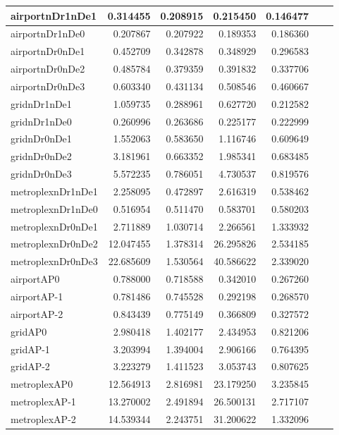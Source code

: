 \begin{longtable}{|l|r|r|r|r|r|r|}
\endlastfoot
airportnDr1nDe1 & 0.314455 & 0.208915 & 0.215450 & 0.146477 \\ \hline
airportnDr1nDe0 & 0.207867 & 0.207922 & 0.189353 & 0.186360 \\ \hline
airportnDr0nDe1 & 0.452709 & 0.342878 & 0.348929 & 0.296583 \\ \hline
airportnDr0nDe2 & 0.485784 & 0.379359 & 0.391832 & 0.337706 \\ \hline
airportnDr0nDe3 & 0.603340 & 0.431134 & 0.508546 & 0.460667 \\ \hline
gridnDr1nDe1 & 1.059735 & 0.288961 & 0.627720 & 0.212582 \\ \hline
gridnDr1nDe0 & 0.260996 & 0.263686 & 0.225177 & 0.222999 \\ \hline
gridnDr0nDe1 & 1.552063 & 0.583650 & 1.116746 & 0.609649 \\ \hline
gridnDr0nDe2 & 3.181961 & 0.663352 & 1.985341 & 0.683485 \\ \hline
gridnDr0nDe3 & 5.572235 & 0.786051 & 4.730537 & 0.819576 \\ \hline
metroplexnDr1nDe1 & 2.258095 & 0.472897 & 2.616319 & 0.538462 \\ \hline
metroplexnDr1nDe0 & 0.516954 & 0.511470 & 0.583701 & 0.580203 \\ \hline
metroplexnDr0nDe1 & 2.711889 & 1.030714 & 2.266561 & 1.333932 \\ \hline
metroplexnDr0nDe2 & 12.047455 & 1.378314 & 26.295826 & 2.534185 \\ \hline
metroplexnDr0nDe3 & 22.685609 & 1.530564 & 40.586622 & 2.339020 \\ \hline
airportAP0 & 0.788000 & 0.718588 & 0.342010 & 0.267260 \\ \hline
airportAP-1 & 0.781486 & 0.745528 & 0.292198 & 0.268570 \\ \hline
airportAP-2 & 0.843439 & 0.775149 & 0.366809 & 0.327572 \\ \hline
gridAP0 & 2.980418 & 1.402177 & 2.434953 & 0.821206 \\ \hline
gridAP-1 & 3.203994 & 1.394004 & 2.906166 & 0.764395 \\ \hline
gridAP-2 & 3.223279 & 1.411523 & 3.053743 & 0.807625 \\ \hline
metroplexAP0 & 12.564913 & 2.816981 & 23.179250 & 3.235845 \\ \hline
metroplexAP-1 & 13.270002 & 2.491894 & 26.500131 & 2.717107 \\ \hline
metroplexAP-2 & 14.539344 & 2.243751 & 31.200622 & 1.332096 \\ \hline

\end{longtable}
